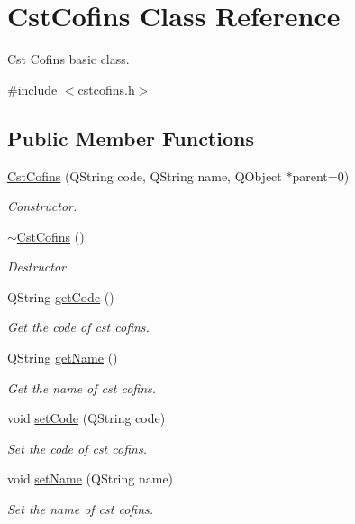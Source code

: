 \hypertarget{class_cst_cofins}{\section{\-Cst\-Cofins \-Class \-Reference}
\label{class_cst_cofins}
}


\-Cst \-Cofins basic class.  




{\ttfamily \#include $<$cstcofins.\-h$>$}

\subsection*{\-Public \-Member \-Functions}
\begin{DoxyCompactItemize}
\item 
\hyperlink{class_cst_cofins_a7ae42b601ebd40e4f22353900f88db49}{\-Cst\-Cofins} (\-Q\-String code, \-Q\-String name, \-Q\-Object $\ast$parent=0)
\begin{DoxyCompactList}\small\item\em \-Constructor. \end{DoxyCompactList}\item 
\hyperlink{class_cst_cofins_a85d7427c9211a5d375914c534977174b}{$\sim$\-Cst\-Cofins} ()
\begin{DoxyCompactList}\small\item\em \-Destructor. \end{DoxyCompactList}\item 
\-Q\-String \hyperlink{class_cst_cofins_a3d45b5d31f1559e72823763340355af7}{get\-Code} ()
\begin{DoxyCompactList}\small\item\em \-Get the code of cst cofins. \end{DoxyCompactList}\item 
\-Q\-String \hyperlink{class_cst_cofins_a25833a2415b00a9df5763b952e137e92}{get\-Name} ()
\begin{DoxyCompactList}\small\item\em \-Get the name of cst cofins. \end{DoxyCompactList}\item 
void \hyperlink{class_cst_cofins_ad8b64084363d74468098ef1696dd8baa}{set\-Code} (\-Q\-String code)
\begin{DoxyCompactList}\small\item\em \-Set the code of cst cofins. \end{DoxyCompactList}\item 
void \hyperlink{class_cst_cofins_acd1996dfd241569a3165f30850558486}{set\-Name} (\-Q\-String name)
\begin{DoxyCompactList}\small\item\em \-Set the name of cst cofins. \end{DoxyCompactList}\end{DoxyCompactItemize}


